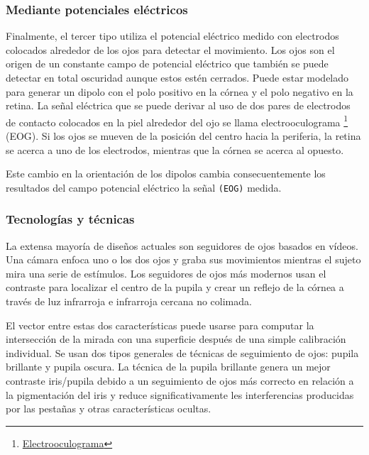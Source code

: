 \documentclass[12pt]{article} %
\begin{document}
		\subsubsection{Mediante potenciales eléctricos}
        	Finalmente, el tercer tipo utiliza el potencial eléctrico medido con electrodos colocados alrededor de los ojos para detectar el
            movimiento. Los ojos son el origen de un constante campo de potencial eléctrico que también se puede detectar en total oscuridad
            aunque estos estén cerrados. Puede estar modelado para generar un dipolo con el polo positivo en la córnea y el polo negativo en
            la retina.
            La señal eléctrica que se puede derivar al uso de dos pares de electrodos de contacto colocados en la piel alrededor del ojo se
            llama electrooculograma \footnote{\href{https://es.wikipedia.org/wiki/Electrooculograma}{Electrooculograma}} (EOG). 
            Si los ojos se mueven de la posición del centro hacia la periferia, la retina se acerca a uno de los electrodos, mientras que la
            córnea se acerca al opuesto.
            
            Este cambio en la orientación de los dipolos cambia consecuentemente los resultados del campo potencial eléctrico la señal
            \texttt{(EOG)} medida.
            
        \subsubsection{Tecnologías y técnicas}
        	La extensa mayoría de diseños actuales son seguidores de ojos basados en vídeos. Una cámara enfoca uno o los dos ojos y graba sus
            movimientos mientras el sujeto mira una serie de estímulos. Los seguidores de ojos más modernos usan el contraste para localizar
            el centro de la pupila y crear un reflejo de la córnea a través de luz infrarroja e infrarroja cercana no colimada.
            
            El vector entre estas dos características puede usarse para computar la intersección de la mirada con una superficie después de
            una simple calibración individual. Se usan dos tipos generales de técnicas de seguimiento de ojos: pupila brillante y pupila
            oscura. 
            La técnica de la pupila brillante genera un mejor contraste iris/pupila debido a un seguimiento de ojos más correcto en relación 
            a la pigmentación del iris y reduce significativamente les interferencias producidas por las pestañas y otras características
            ocultas.
            
\end{document}
